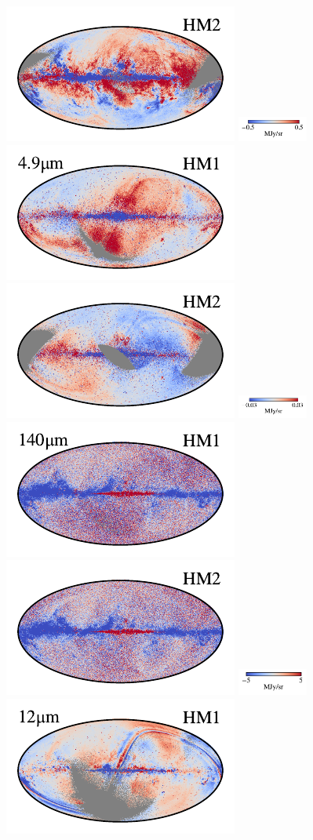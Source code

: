 \documentclass[twocolumn]{aa}
\begin{document}
\begin{figure}[t]
    \includegraphics[width=0.22\linewidth]{figs/compare_res/cosmoglobe_res_08b.pdf}%
    \includegraphics[width=23mm,angle=90]{figs/compare_res/cbar_08.pdf}\\
    \includegraphics[width=0.22\linewidth]{figs/compare_res/cosmoglobe_res_04a.pdf}%
    \includegraphics[width=0.22\linewidth]{figs/compare_res/cosmoglobe_res_04b.pdf}%
    \includegraphics[width=23mm,angle=90]{figs/compare_res/cbar_04.pdf}\hspace*{3mm}
    \includegraphics[width=0.22\linewidth]{figs/compare_res/cosmoglobe_res_09a.pdf}%
    \includegraphics[width=0.22\linewidth]{figs/compare_res/cosmoglobe_res_09b.pdf}%
    \includegraphics[width=23mm,angle=90]{figs/compare_res/cbar_09.pdf}\\
    \includegraphics[width=0.22\linewidth]{figs/compare_res/cosmoglobe_res_05a.pdf}%

\end{figure}
\end{document}
